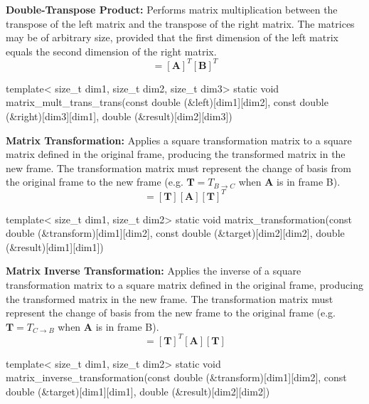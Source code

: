\documentclass[11pt,fleqn]{report}
\begin{document}
\textbf{Double-Transpose Product:}
Performs matrix multiplication between the transpose of the left matrix 
and the transpose of the right matrix. The matrices may be of arbitrary
size, provided that the first dimension of the left matrix equals the
second dimension of the right matrix.
\begin{equation*}
[\textbf{Y}] = [\textbf{A}]^T [\textbf{B}]^T
\end{equation*}
\begin{code}
template< size_t dim1, size_t dim2, size_t dim3>
static void matrix_mult_trans_trans(const double (&left)[dim1][dim2],
                                    const double (&right)[dim3][dim1],
                                    double (&result)[dim2][dim3])
\end{code}

\textbf{Matrix Transformation:}
Applies a square transformation matrix to a square matrix defined in the
original frame, producing the transformed matrix in the new frame. The 
transformation matrix must represent the change of basis from the original 
frame to the new frame (e.g. $\textbf{T} = T_{B \rightarrow C}$ when 
$\textbf{A}$ is in frame B).
\begin{equation*}
[\textbf{Y}] = [\textbf{T}] [\textbf{A}] [\textbf{T}]^T
\end{equation*}
\begin{code}
template< size_t dim1, size_t dim2>
static void matrix_transformation(const double (&transform)[dim1][dim2],
                                  const double (&target)[dim2][dim2],
                                  double (&result)[dim1][dim1])
\end{code}

\textbf{Matrix Inverse Transformation:}
Applies the inverse of a square transformation matrix to a square matrix defined in the
original frame, producing the transformed matrix in the new frame. The 
transformation matrix must represent the change of basis from the new 
frame to the original frame (e.g. $\textbf{T} = T_{C \rightarrow B}$ when 
$\textbf{A}$ is in frame B).
\begin{equation*}
[\textbf{Y}] = [\textbf{T}]^T [\textbf{A}] [\textbf{T}]
\end{equation*}
\begin{code}
template< size_t dim1, size_t dim2>
static void matrix_inverse_transformation(const double (&transform)[dim1][dim2],
                                          const double (&target)[dim1][dim1],
                                          double (&result)[dim2][dim2])
\end{code}
\end{document}
